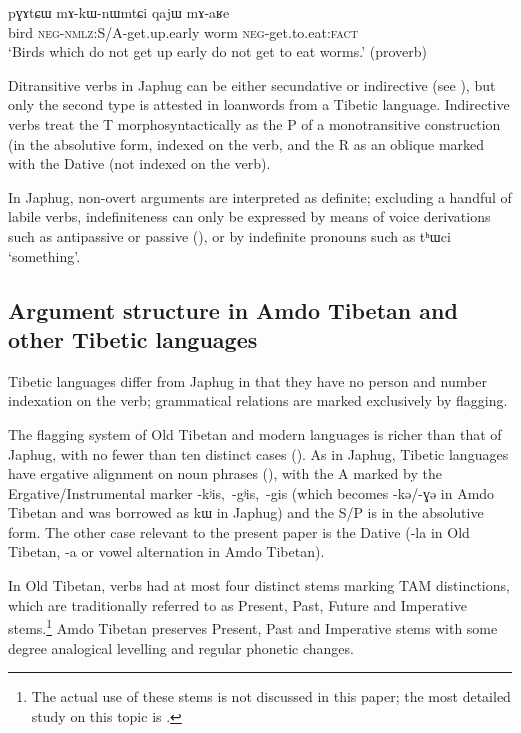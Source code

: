\documentclass[oldfontcommands,oneside,a4paper,11pt]{article}
\newcommand{\ipa}[1]{{\phon \mbox{#1}}} %
\begin{document}
\begin{exe}
\ex \label{ex:maRe}
\gll
\ipa{pɣɤtɕɯ}  	\ipa{mɤ-kɯ-nɯmtɕi}  	\ipa{qajɯ}  	\ipa{mɤ-aʁe}  \\
bird \textsc{neg-nmlz}:S/A-get.up.early worm \textsc{neg}-get.to.eat:\textsc{fact} \\
\glt `Birds which do not get up early do not get to eat worms.' (proverb) 
\end{exe}  

Ditransitive verbs in Japhug can be either secundative or indirective (see \citealt{jacques14antipassive}), but only the second type is attested in loanwords from a Tibetic language. Indirective verbs treat the T morphosyntactically as the P of a monotransitive construction (in the absolutive form, indexed on the verb, and the R as an oblique marked with the Dative (not indexed on the verb).

In Japhug, non-overt arguments are interpreted as definite; excluding a handful of labile verbs, indefiniteness can only be expressed by means of voice derivations such as antipassive or passive (\citealt{jacques12demotion}), or by indefinite pronouns such as \ipa{tʰɯci} `something'.

\subsection{Argument structure in Amdo Tibetan and other Tibetic languages}
Tibetic languages differ from Japhug in that they have no person and number indexation on the verb; grammatical relations are marked exclusively by flagging.

The flagging system of Old Tibetan and modern languages is richer than that of Japhug,  with no fewer than ten distinct cases (\citealt{tournadre10cases, hill12bas}). As in Japhug, Tibetic languages have ergative alignment on noun phrases (\citealt{tournadre96erg}), with the A marked by the Ergative/Instrumental marker \ipa{-kʲis, -gʲis, -gis} (which becomes \ipa{-kə/-ɣə} in Amdo Tibetan and was borrowed as \ipa{kɯ} in Japhug) and the S/P is in the absolutive form. The other case relevant to the present paper is the Dative (\ipa{-la} in Old Tibetan, \ipa{-a} or vowel alternation in Amdo Tibetan).


In Old Tibetan, verbs had at most four distinct stems marking TAM distinctions, which are traditionally referred to as Present, Past, Future and Imperative stems.\footnote{The actual use of these stems is not discussed in this paper; the most detailed study on this topic is \citet{zeisler04}.} Amdo Tibetan preserves Present, Past and Imperative stems with some degree analogical levelling and regular phonetic changes.
\end{document}
